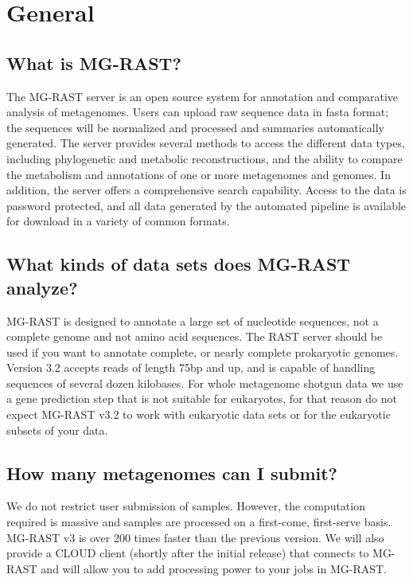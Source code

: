 \documentclass[12pt,fullpage]{report}
\begin{document}
\section{General}
\subsection{What is MG-RAST?}
The MG-RAST server is an open source system for annotation and comparative analysis of metagenomes. Users can upload raw sequence data in fasta format; the sequences will be normalized and processed and summaries automatically generated. The server provides several methods to access the different data types, including phylogenetic and metabolic reconstructions, and the ability to compare the metabolism and annotations of one or more metagenomes and genomes. In addition, the server offers a comprehensive search capability. Access to the data is password protected, and all data generated by the automated pipeline is available for download in a variety of common formats.
\subsection{What kinds of data sets does MG-RAST analyze?}
MG-RAST is designed to annotate a large set of nucleotide sequences, not a complete genome and not amino acid sequences. The RAST server should be used if you want to annotate complete, or nearly complete prokaryotic genomes. Version 3.2 accepts reads of length 75bp and up, and is capable of handling sequences of several dozen kilobases. For whole metagenome shotgun data we use a gene prediction step that is not suitable for eukaryotes, for that reason do not expect MG-RAST v3.2 to work with eukaryotic data sets or for the eukaryotic subsets of your data.
\subsection{How many metagenomes can I submit?}
We do not restrict user submission of samples. However, the computation required is massive and samples are processed on a first-come, first-serve basis. MG-RAST v3 is over 200 times faster than the previous version. We will also provide a CLOUD client (shortly after the initial release) that connects to MG-RAST and will allow you to add processing power to your jobs in MG-RAST.
\end{document}
